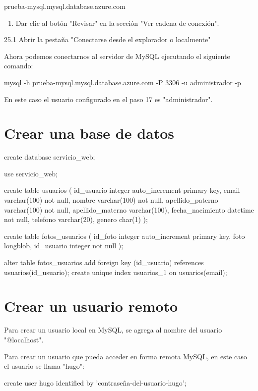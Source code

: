 prueba-mysql.mysql.database.azure.com

\begin{enumerate}
\item Dar clic al botón "Revisar" en la sección "Ver cadena de conexión".
\end{enumerate}

25.1 Abrir la pestaña "Conectarse desde el explorador o localmente"

\begin{SourceCode}
Ahora podemos conectarnos al servidor de MySQL ejecutando el siguiente comando:

mysql -h prueba-mysql.mysql.database.azure.com -P 3306 -u administrador -p
\end{SourceCode}

En este caso el usuario configurado en el paso 17 es "administrador".

\section{Crear una base de datos}

\begin{SourceCode}
create database servicio_web;

use servicio_web;

create table usuarios
(
id_usuario integer auto_increment primary key,
email varchar(100) not null,
nombre varchar(100) not null,
apellido_paterno varchar(100) not null,
apellido_materno varchar(100),
fecha_nacimiento datetime not null,
telefono varchar(20),
genero char(1)
);

create table fotos_usuarios
(
id_foto integer auto_increment primary key,
foto longblob,
id_usuario integer not null
);

alter table fotos_usuarios add foreign key (id_usuario) references usuarios(id_usuario);
create unique index usuarios_1 on usuarios(email);
\end{SourceCode}

\section{Crear un usuario remoto}

Para crear un usuario local en MySQL, se agrega al nombre del usuario "@localhost".

Para crear un usuario que pueda acceder en forma remota MySQL, en este caso el usuario se llama "hugo":

create user hugo identified by 'contraseña-del-usuario-hugo';

